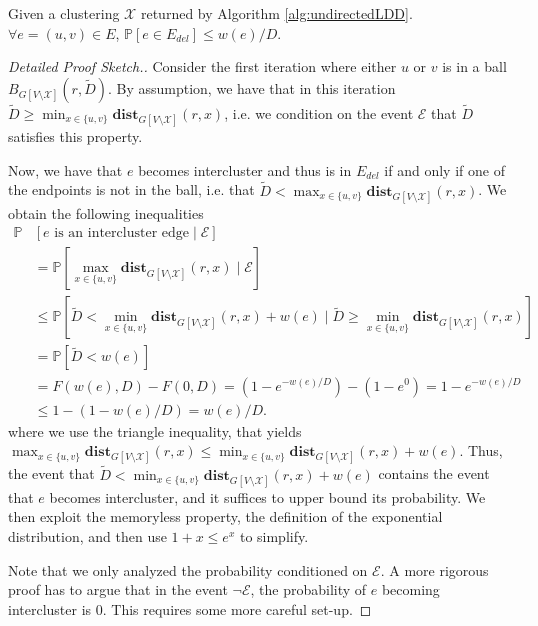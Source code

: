 \begin{claim}
Given a clustering $\mathcal{X}$ returned by Algorithm \ref{alg:undirectedLDD}. $\forall e = (u,v) \in E$, $\mathbb{P}[e \in E_{del}] \leq w(e)/ D$. 
\end{claim}
\begin{proof}[Detailed Proof Sketch.]
Consider the first iteration where either $u$ or $v$ is in a ball $B_{G[V \setminus \mathcal{X}]}(r, \tilde{D})$. By assumption, we have that in this iteration $\tilde{D} \geq \min_{x \in \{u,v\}} \mathbf{dist}_{G[V \setminus \mathcal{X}]}(r, x)$, i.e. we condition on the event $\mathcal{E}$ that $\tilde{D}$ satisfies this property. 

Now, we have that $e$ becomes intercluster and thus is in $E_{del}$ if and only if one of the endpoints is not in the ball, i.e. that $\tilde{D} < \max_{x \in \{u,v\}} \mathbf{dist}_{G[V \setminus \mathcal{X}]}(r, x)$. We obtain the following inequalities 
\begin{align*}
\mathbb{P}&[e \text{ is an intercluster edge} \;|\; \mathcal{E}] \\
    &= \mathbb{P}[\max_{x \in \{u,v\}} \mathbf{dist}_{G[V \setminus \mathcal{X}]}(r, x) \;|\; \mathcal{E}] \\
    &\leq \mathbb{P}[\tilde{D} < \min_{x \in \{u,v\}} \mathbf{dist}_{G[V \setminus \mathcal{X}]}(r, x) + w(e)  \;|\; \tilde{D} \geq \min_{x \in \{u,v\}} \mathbf{dist}_{G[V \setminus \mathcal{X}]}(r, x)] \\
    &= \mathbb{P}[\tilde{D} < w(e)] \\
	&= F(w(e), D) - F(0, D) = (1 - e^{-w(e)/D}) - (1 - e^{0}) = 1 - e^{-w(e)/D} \\ &\leq 1 - (1 - w(e)/D) = w(e)/D.
\end{align*}
where we use the triangle inequality, that yields $\max_{x \in \{u,v\}} \mathbf{dist}_{G[V \setminus \mathcal{X}]}(r, x) \leq \min_{x \in \{u,v\}} \mathbf{dist}_{G[V \setminus \mathcal{X}]}(r, x) + w(e)$. Thus, the event that $ \tilde{D} < \min_{x \in \{u,v\}} \mathbf{dist}_{G[V \setminus \mathcal{X}]}(r, x) + w(e)$ contains the event that $e$ becomes intercluster, and it suffices to upper bound its probability. We then exploit the memoryless property, the definition of the exponential distribution, and then use $1+x \leq e^x$ to simplify.

Note that we only analyzed the probability conditioned on $\mathcal{E}$. A more rigorous proof has to argue that in the event $\neg \mathcal{E}$, the probability of $e$ becoming intercluster is $0$. This requires some more careful set-up.
\end{proof}

